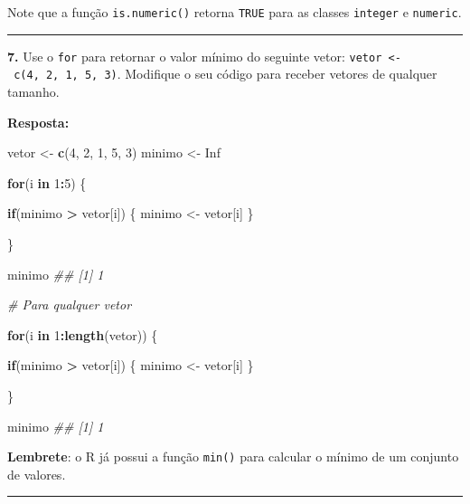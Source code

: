 \documentclass[]{book}
\newenvironment{Shaded}{\begin{snugshade}}{\end{snugshade}}
\newcommand{\CommentTok}[1]{\textcolor[rgb]{0.56,0.35,0.01}{\textit{#1}}}
\newcommand{\ControlFlowTok}[1]{\textcolor[rgb]{0.13,0.29,0.53}{\textbf{#1}}}
\newcommand{\DecValTok}[1]{\textcolor[rgb]{0.00,0.00,0.81}{#1}}
\newcommand{\KeywordTok}[1]{\textcolor[rgb]{0.13,0.29,0.53}{\textbf{#1}}}
\newcommand{\NormalTok}[1]{#1}
\newcommand{\OperatorTok}[1]{\textcolor[rgb]{0.81,0.36,0.00}{\textbf{#1}}}
\newcommand{\OtherTok}[1]{\textcolor[rgb]{0.56,0.35,0.01}{#1}}
\newcommand{\StringTok}[1]{\textcolor[rgb]{0.31,0.60,0.02}{#1}}
\begin{document}
Note que a função \texttt{is.numeric()} retorna \texttt{TRUE} para as classes \texttt{integer} e \texttt{numeric}.

\begin{center}\rule{0.5\linewidth}{0.5pt}\end{center}

\textbf{7.} Use o \texttt{for} para retornar o valor mínimo do seguinte vetor: \texttt{vetor\ \textless{}-\ c(4,\ 2,\ 1,\ 5,\ 3)}. Modifique o seu código para receber vetores de qualquer tamanho.

\textbf{Resposta:}

\begin{Shaded}
\begin{Highlighting}[]

\NormalTok{vetor <-}\StringTok{ }\KeywordTok{c}\NormalTok{(}\DecValTok{4}\NormalTok{, }\DecValTok{2}\NormalTok{, }\DecValTok{1}\NormalTok{, }\DecValTok{5}\NormalTok{, }\DecValTok{3}\NormalTok{)}
\NormalTok{minimo <-}\StringTok{ }\OtherTok{Inf}

\ControlFlowTok{for}\NormalTok{(i }\ControlFlowTok{in} \DecValTok{1}\OperatorTok{:}\DecValTok{5}\NormalTok{) \{}
  
  \ControlFlowTok{if}\NormalTok{(minimo }\OperatorTok{>}\StringTok{ }\NormalTok{vetor[i]) \{}
\NormalTok{    minimo <-}\StringTok{ }\NormalTok{vetor[i]}
\NormalTok{  \}}
  
\NormalTok{\}}

\NormalTok{minimo}
\CommentTok{## [1] 1}

\CommentTok{# Para qualquer vetor}

\ControlFlowTok{for}\NormalTok{(i }\ControlFlowTok{in} \DecValTok{1}\OperatorTok{:}\KeywordTok{length}\NormalTok{(vetor)) \{}
  
  \ControlFlowTok{if}\NormalTok{(minimo }\OperatorTok{>}\StringTok{ }\NormalTok{vetor[i]) \{}
\NormalTok{    minimo <-}\StringTok{ }\NormalTok{vetor[i]}
\NormalTok{  \}}
  
\NormalTok{\}}

\NormalTok{minimo}
\CommentTok{## [1] 1}
\end{Highlighting}
\end{Shaded}

\textbf{Lembrete}: o R já possui a função \texttt{min()} para calcular o mínimo de um conjunto de valores.

\begin{center}\rule{0.5\linewidth}{0.5pt}\end{center}
\end{document}
